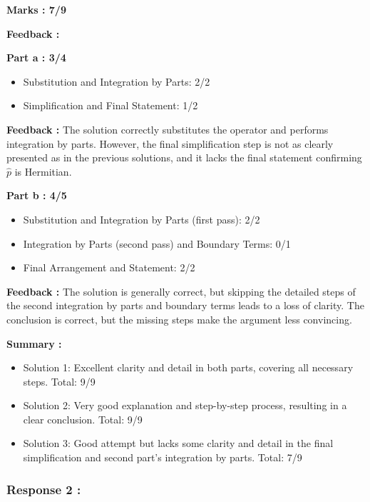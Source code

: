 \documentclass[a4paper,11pt]{article}
\begin{document}
\textbf{Marks : 7/9}

\textbf{Feedback :}

\textbf{Part a : 3/4}

\begin{itemize}
    \item Substitution and Integration by Parts: 2/2
    \item Simplification and Final Statement: 1/2
\end{itemize}

\textbf{Feedback :}
The solution correctly substitutes the operator and performs integration by parts. However, the final simplification step is not as clearly presented as in the previous solutions, and it lacks the final statement confirming $\hat{p}$ is Hermitian.


\textbf{Part b : 4/5}

\begin{itemize}
    \item Substitution and Integration by Parts (first pass): 2/2
    \item Integration by Parts (second pass) and Boundary Terms: 0/1
    \item Final Arrangement and Statement: 2/2
\end{itemize}

\textbf{Feedback :}
The solution is generally correct, but skipping the detailed steps of the second integration by parts and boundary terms leads to a loss of clarity. The conclusion is correct, but the missing steps make the argument less convincing.


\textbf{Summary :}

\begin{itemize}
    \item Solution 1: Excellent clarity and detail in both parts, covering all necessary steps. Total: 9/9
    \item Solution 2: Very good explanation and step-by-step process, resulting in a clear conclusion. Total: 9/9
    \item Solution 3: Good attempt but lacks some clarity and detail in the final simplification and second part's integration by parts. Total: 7/9
\end{itemize}



\subsubsection*{Response 2 :}
\end{document}
